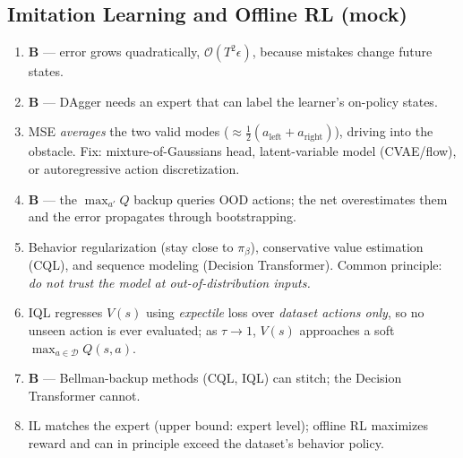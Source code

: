 \documentclass[11pt,oneside]{article}
\newcommand{\dataset}{\mathcal{D}}
\newcommand{\bigO}[1]{\mathcal{O}\!\left(#1\right)}
\begin{document}
\subsection*{Imitation Learning and Offline RL (mock)}
\begin{enumerate}[label=\textbf{Q\arabic*.}, leftmargin=3em, itemsep=3pt, start=13]
  \item \textbf{B} --- error grows quadratically, $\bigO{T^2\epsilon}$, because mistakes change future states.
  \item \textbf{B} --- DAgger needs an expert that can label the learner's on-policy states.
  \item MSE \emph{averages} the two valid modes ($\approx\frac12(a_{\text{left}}+a_{\text{right}})$), driving into the obstacle. Fix: mixture-of-Gaussians head, latent-variable model (CVAE/flow), or autoregressive action discretization.
  \item \textbf{B} --- the $\max_{a'}Q$ backup queries OOD actions; the net overestimates them and the error propagates through bootstrapping.
  \item Behavior regularization (stay close to $\pi_\beta$), conservative value estimation (CQL), and sequence modeling (Decision Transformer). Common principle: \emph{do not trust the model at out-of-distribution inputs.}
  \item IQL regresses $V(s)$ using \emph{expectile} loss over \emph{dataset actions only}, so no unseen action is ever evaluated; as $\tau\to1$, $V(s)$ approaches a soft $\max_{a\in\dataset}Q(s,a)$.
  \item \textbf{B} --- Bellman-backup methods (CQL, IQL) can stitch; the Decision Transformer cannot.
  \item IL matches the expert (upper bound: expert level); offline RL maximizes reward and can in principle exceed the dataset's behavior policy.
\end{enumerate}
\end{document}
